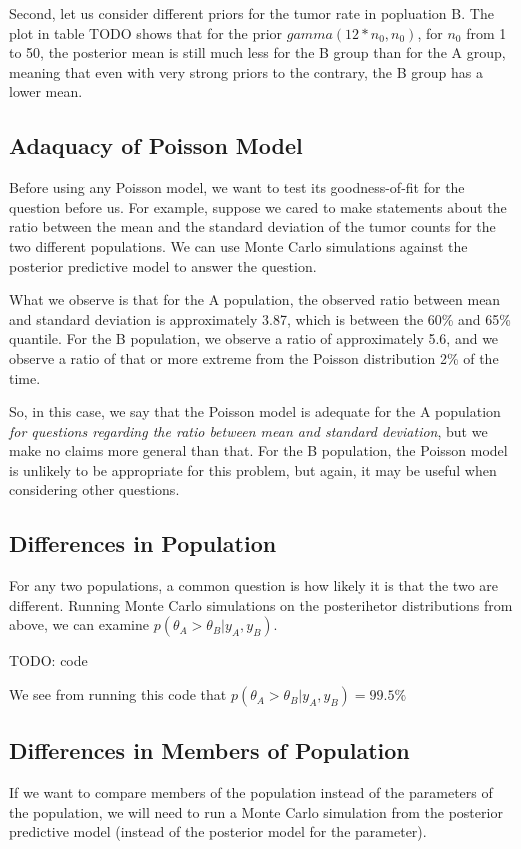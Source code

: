 \documentclass[12pt]{article}
\begin{document}
Second, let us consider different priors for the tumor rate in popluation B. The plot in table TODO shows that for the prior $gamma(12*n_0,n_0)$, for $n_0$ from 1 to 50, the posterior mean is still much less for the B group than for the A group, meaning that even with very strong priors to the contrary, the B group has a lower mean.



\subsection{Adaquacy of Poisson Model}
Before using any Poisson model, we want to test its goodness-of-fit for the question before us. For example, suppose we cared to make statements about the ratio between the mean and the standard deviation of the tumor counts for the two different populations. We can use Monte Carlo simulations against the posterior predictive model to answer the question.

What we observe is that for the A population, the observed ratio between mean and standard deviation is approximately 3.87, which is between the 60\% and 65\% quantile. For the B population, we observe a ratio of approximately 5.6, and we observe a ratio of that or more extreme from the Poisson distribution 2\% of the time.

So, in this case, we say that the Poisson model is adequate for the A population \emph{for questions regarding the ratio between mean and standard deviation}, but we make no claims more general than that. For the B population, the Poisson model is unlikely to be appropriate for this problem, but again, it may be useful when considering other questions.

\subsection{Differences in Population}
For any two populations, a common question is how likely it is that the two are different. Running Monte Carlo simulations on the posterihetor distributions from above, we can examine $p(\theta_A>\theta_B|y_A,y_B)$.

TODO: code

We see from running this code that $p(\theta_A>\theta_B|y_A,y_B)=99.5\%$

\subsection{Differences in Members of Population}
If we want to compare members of the population instead of the parameters of the population, we will need to run a Monte Carlo simulation from the posterior predictive model (instead of the posterior model for the parameter).
\end{document}
